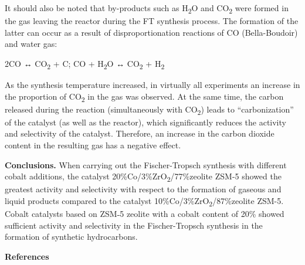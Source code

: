 \begin{multicols}{2}
It should also be noted that by-products such as H\textsubscript{2}O and
CO\textsubscript{2} were formed in the gas leaving the reactor during
the FT synthesis process. The formation of the latter can occur as a
result of disproportionation reactions of CO (Bella-Boudoir) and water
gas:

2CO ↔ CO\textsubscript{2} + C; CO + H\textsubscript{2}O ↔
CO\textsubscript{2} + H\textsubscript{2}

As the synthesis temperature increased, in virtually all experiments an
increase in the proportion of CO\textsubscript{2} in the gas was
observed. At the same time, the carbon released during the reaction
(simultaneously with CO\textsubscript{2}) leads to ``carbonization'' of
the catalyst (as well as the reactor), which significantly reduces the
activity and selectivity of the catalyst. Therefore, an increase in the
carbon dioxide content in the resulting gas has a negative effect.

{\bfseries Conclusions.} When carrying out the Fischer-Tropsch synthesis
with different cobalt additions, the catalyst
20\%Co/3\%ZrO\textsubscript{2}/77\%zeolite ZSM-5 showed the greatest
activity and selectivity with respect to the formation of gaseous and
liquid products compared to the catalyst
10\%Co/3\%ZrO\textsubscript{2}/87\%zeolite ZSM-5. Cobalt catalysts based
on ZSM˗5 zeolite with a cobalt content of 20\% showed sufficient
activity and selectivity in the Fischer-Tropsch synthesis in the
formation of synthetic hydrocarbons.
\end{multicols}

\begin{center}
{\bfseries References}
\end{center}

